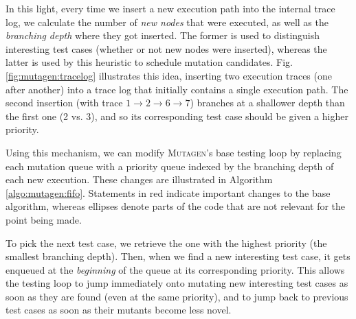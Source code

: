 \documentclass[sigconf, anonymous, review]{acmart}
\newcommand{\mutagen}{\textsc{Mutagen}\xspace}
\begin{document}
In this light, every time we insert a new execution path into the internal trace
log, we calculate the number of \emph{new nodes} that were executed, as well as
the \emph{branching depth} where they got inserted.
%
The former is used to distinguish interesting test cases (whether or not new
nodes were inserted), whereas the latter is used by this heuristic to schedule
mutation candidates.
%
Fig. \ref{fig:mutagen:tracelog} illustrates this idea, inserting two execution
traces (one after another) into a trace log that initially contains a single
execution path.
%
The second insertion (with trace $1 \rightarrow 2 \rightarrow 6 \rightarrow 7$)
branches at a shallower depth than the first one (2 vs. 3), and so its
corresponding test case should be given a higher priority.


Using this mechanism, we can modify \mutagen's base testing loop by replacing
each mutation queue with a priority queue indexed by the branching depth of each
new execution.
%
These changes are illustrated in Algorithm \ref{algo:mutagen:fifo}.
%
Statements in {\color{red} red} indicate important changes to the base
algorithm, whereas ellipses denote parts of the code that are not relevant for
the point being made.


To pick the next test case, we retrieve the one with the highest priority (the
smallest branching depth).
%
Then, when we find a new interesting test case, it gets enqueued at the
\emph{beginning} of the queue at its corresponding priority.
%
This allows the testing loop to jump immediately onto mutating new interesting
test cases as soon as they are found (even at the same priority), and to jump
back to previous test cases as soon as their mutants become less novel.

\end{document}
